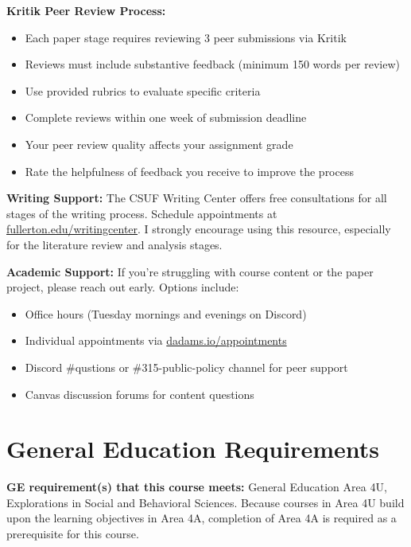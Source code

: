 \documentclass[12pt]{article}     %
\begin{document}
\vspace{0.5em}
\noindent \textbf{Kritik Peer Review Process:} 
\begin{itemize}
\item Each paper stage requires reviewing 3 peer submissions via Kritik
\item Reviews must include substantive feedback (minimum 150 words per review)
\item Use provided rubrics to evaluate specific criteria
\item Complete reviews within one week of submission deadline
\item Your peer review quality affects your assignment grade
\item Rate the helpfulness of feedback you receive to improve the process
\end{itemize}

\vspace{0.5em}
\noindent \textbf{Writing Support:} The CSUF Writing Center offers free consultations for all stages of the writing process. Schedule appointments at \href{http://www.fullerton.edu/writingcenter/}{fullerton.edu/writingcenter}. I strongly encourage using this resource, especially for the literature review and analysis stages.

\vspace{0.5em}
\noindent \textbf{Academic Support:} If you're struggling with course content or the paper project, please reach out early. Options include:
\begin{itemize}
\item Office hours (Tuesday mornings and evenings on Discord)
\item Individual appointments via \href{https://dadams.io/appointments}{dadams.io/appointments}
\item Discord \#qustions or \#315-public-policy channel for peer support
\item Canvas discussion forums for content questions
\end{itemize}

\section{General Education Requirements}
\noindent \textbf{GE requirement(s) that this course meets:} General Education Area 4U, Explorations in Social and Behavioral Sciences. Because courses in Area 4U build upon the learning objectives in Area 4A, completion of Area 4A is required as a prerequisite for this course.
\end{document}
